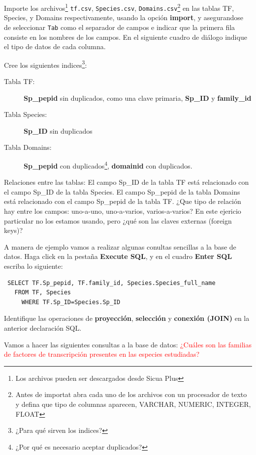 \documentclass[letter,11pt]{book}
\begin{document}
Importe los archivos\footnote{Los archivos pueden ser descargados desde Sicua Plus} \Verb+tf.csv+, \Verb+Species.csv+, \Verb+Domains.csv+\footnote{Antes de importat abra cada uno de los archivos con un procesador de texto y defina que tipo de columnas aparecen, VARCHAR, NUMERIC, INTEGER, FLOAT} en las tablas TF, Species, y Domains respectivamente, usando la opción \textbf{import}, y asegurandose de seleccionar \Verb+Tab+ como el separador de campos e indicar que la primera fila consiste en los nombres de los campos. En el siguiente cuadro de diálogo indique el tipo de datos de cada columna.

Cree los siguientes indices\footnote{¿Para qué sirven los indices?}:

\begin{description}
\item[Tabla TF:]\textbf{Sp\_pepid} sin duplicados, como una clave primaria, \textbf{Sp\_ID} y \textbf{family\_id}
\item[Tabla Species:] \textbf{Sp\_ID} sin duplicados
\item[Tabla Domains:] \textbf{Sp\_pepid} con duplicados\footnote{¿Por qué es necesario aceptar duplicados?}, \textbf{domainid} con duplicados.
\end{description}

Relaciones entre las tablas: El campo Sp\_ID de la tabla TF está relacionado con el campo Sp\_ID de la tabla Species. El campo Sp\_pepid de la tabla Domains está relacionado con el campo Sp\_pepid de la tabla TF. ¿Que tipo de relación hay entre los campos: uno-a-uno, uno-a-varios, varios-a-varios? En este ejericio particular no los estamos usando, pero ¿qué son las claves externas (foreign keys)?

A manera de ejemplo vamos a realizar algunas conultas sencillas a la base de datos. Haga click en la pestaña \textbf{Execute SQL}, y en el cuadro \textbf{Enter SQL} escriba lo siguiente:

\begin{Verbatim}
 SELECT TF.Sp_pepid, TF.family_id, Species.Species_full_name 
   FROM TF, Species
     WHERE TF.Sp_ID=Species.Sp_ID 
\end{Verbatim}

Identifique las operaciones de \textbf{proyección}, \textbf{selección} y \textbf{conexión (JOIN)} en la anterior declaración SQL.

Vamos a hacer las siguientes consultas a la base de datos: \textcolor{red}{¿Cuáles son las familias de factores de transcripción presentes en las especies estudiadas?}
\end{document}
